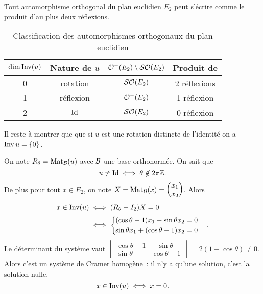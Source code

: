 \begin{theo}
  Tout automorphisme orthogonal du plan euclidien \(E_2\) peut s'écrire comme le produit d'au plus deux réflexions.
  \begin{table}[!h]
    \centering
    \begin{tabular}{|c|c|c|c|}\hline
      \(\operatorname{dim}\operatorname{Inv}(u)\) & Nature de \(u\) & \(\mathcal{O}^{-}\!\left(E_2\right)\setminus\mathcal{SO}\!\left(E_2\right)\)& Produit de \\ \hline
      0 & rotation & \(\mathcal{SO}\!\left(E_2\right)\) & 2 réflexions \\
      1 & réflexion & \(\mathcal{O}^{-}\!\left(E_2\right)\) & 1 réflexion \\
      2 & \(\operatorname{Id}\) & \(\mathcal{SO}\!\left(E_2\right)\) & 0 réflexion \\ \hline
    \end{tabular}
    \caption{Classification des automorphismes orthogonaux du plan euclidien}
    \label{tab:ClassOrth}
  \end{table}
\end{theo}

Il reste à montrer que  que si \(u\) est une rotation distincte de l'identité on a \(\operatorname{Inv} u =\{0\}\). 

On note \(R_\theta=\mathrm{Mat}_{\mathcal{B}}(u)\) avec \(\mathcal{B}\) une base orthonormée. On sait que
\begin{equation}
  u \neq \operatorname{Id} \iff \theta \not\in 2\pi\mathbb{Z}.
\end{equation}
De plus pour tout \(x \in E_2\), on note \(X=\mathrm{Mat}_{\mathcal{B}}(x)=\begin{pmatrix} x_1 \\ x_2 \end{pmatrix}\). Alors
\begin{align}
  x \in \operatorname{Inv}(u) &\iff (R_\theta-I_2)X=0 \\
  &\iff \begin{cases} (\cos\theta -1)x_1 -\sin\theta x_2 = 0 \\ \sin\theta x_1 +(\cos\theta -1)x_2=0 \end{cases}.
\end{align}
Le déterminant du système vaut \(\begin{vmatrix} \cos\theta -1 & -\sin\theta \\ \sin\theta & \cos\theta -1\end{vmatrix} = 2(1-\cos\theta)\neq 0\). Alors c'est un système de Cramer homogène~: il n'y a qu'une solution, c'est la solution nulle.
\begin{equation}
  x \in \operatorname{Inv}(u) \iff x=0.
\end{equation}

